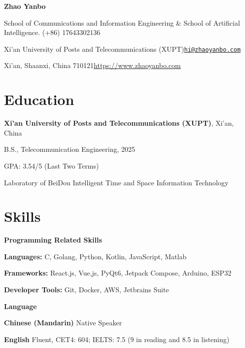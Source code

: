 \documentclass{article}
\newcommand{\cvsection}[1]{\section*{\rmfamily#1}}
\begin{document}
\begin{center}
    \Huge{
    \rmfamily
    \textbf{Zhao Yanbo}}
\end{center}
\vspace{20pt}


\setlength{\parskip}{1pt}
\renewcommand{\arraystretch}{1.25}


\noindent School of Communications and Information Engineering \& School of Artificial Intelligence. \hfill (+86) 17643302136

\noindent Xi'an University of Posts and Telecommunications (XUPT)\hfill \href{mailto:hi@zhaoyanbo.com}{\texttt{hi@zhaoyanbo.com}}

\noindent Xi'an, Shaanxi, China  710121\hfill \url{https://www.zhaoyanbo.com}


\setlength{\parskip}{3pt}


\cvsection{Education}
\indent 

\textbf{Xi'an University of Posts and Telecommunications (XUPT)}, Xi'an, China

\hspace{2em}B.S., Telecommunication Engineering, 2025

\hspace{2em}GPA: 3.54/5 (Last Two Terms)

\hspace{2em}Laboratory of BeiDou Intelligent Time and Space Information Technology



\cvsection{Skills}
\indent 

\textbf{Programming Related Skills}

\hspace{2em}\textbf{Languages: }C, Golang, Python, Kotlin, JavaScript, Matlab

\hspace{2em}\textbf{Frameworks: }React.js, Vue,js, PyQt6, Jetpack Compose, Arduino, ESP32

\hspace{2em}\textbf{Developer Tools: }Git, Docker, AWS, Jetbrains Suite


\textbf{Language}

\hspace{2em}\textbf{Chinese (Mandarin)} Native Speaker

\hspace{2em}\textbf{English} Fluent, CET4: 604; IELTS: 7.5 (9 in reading and 8.5 in listening)
\end{document}
